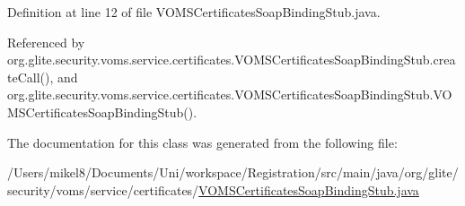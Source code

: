 Definition at line 12 of file VOMSCertificatesSoapBindingStub.java.



Referenced by org.glite.security.voms.service.certificates.VOMSCertificatesSoapBindingStub.createCall(), and org.glite.security.voms.service.certificates.VOMSCertificatesSoapBindingStub.VOMSCertificatesSoapBindingStub().



The documentation for this class was generated from the following file:\begin{DoxyCompactItemize}
\item 
/Users/mikel8/Documents/Uni/workspace/Registration/src/main/java/org/glite/security/voms/service/certificates/\hyperlink{VOMSCertificatesSoapBindingStub_8java}{VOMSCertificatesSoapBindingStub.java}\end{DoxyCompactItemize}
